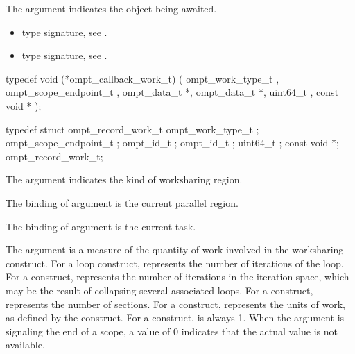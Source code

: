 \argdesc

\epdesc

The argument  indicates the object being awaited. 

\codeptrdesc

\crossreferences
\begin{itemize}
\item {} type signature, see
.
\item {} type signature, see
.
\end{itemize}



\label{sec:ompt_callback_work_t}
\format

\begin{ccppspecific}
\begin{omptCallback}
typedef void (*ompt_callback_work_t) (
  ompt_work_type_t ,
  ompt_scope_endpoint_t ,
  ompt_data_t *,
  ompt_data_t *,
  uint64_t ,
  const void *
);
\end{omptCallback}
\end{ccppspecific}


\record

\begin{ccppspecific}
\begin{omptRecord}
typedef struct ompt_record_work_t {
  ompt_work_type_t ;
  ompt_scope_endpoint_t ;
  ompt_id_t ;
  ompt_id_t ;
  uint64_t ;
  const void *;
} ompt_record_work_t;
\end{omptRecord}
\end{ccppspecific}


\argdesc

The argument  indicates the kind of worksharing
region.

\epdesc

The binding of argument  is the current
parallel region.

The binding of argument  is the current task.

The argument  is a measure of the quantity of work involved in the worksharing construct. 
For a loop construct,  represents the number of iterations of the loop.
For a  construct,  represents the number of iterations in the iteration space, 
which may be the result of collapsing several associated loops.
For a  construct,  represents the number of sections. 
For a  construct,  represents the units of work, as defined by the  construct.
For a  construct,  is always 1.
When the  argument is signaling the end of a scope, a  value of 0 indicates that the actual  value is not available. 

